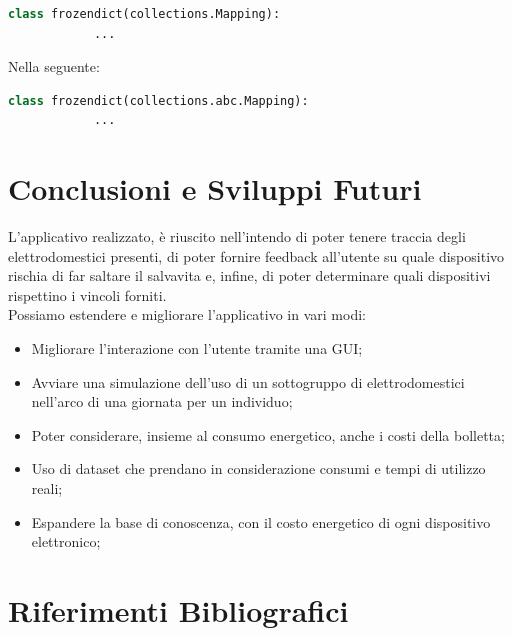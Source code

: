 \documentclass[12pt, letterpaper]{article}
\begin{document}
\begin{lstlisting}[language=Python]
      class frozendict(collections.Mapping):
            ...
\end{lstlisting}

Nella seguente:

\begin{lstlisting}[language=Python]
      class frozendict(collections.abc.Mapping):
            ...
\end{lstlisting}

\section{Conclusioni e Sviluppi Futuri}

L'applicativo realizzato, è riuscito nell'intendo di poter tenere traccia degli elettrodomestici
presenti, di poter fornire feedback all'utente su quale dispositivo rischia di far saltare il salvavita
e, infine, di poter determinare quali dispositivi rispettino i vincoli forniti. \\

\noindent Possiamo estendere e migliorare l'applicativo in vari modi:
\begin{itemize}
      \item Migliorare l'interazione con l'utente tramite una GUI;
      \item Avviare una simulazione dell'uso di un sottogruppo di elettrodomestici
            nell'arco di una giornata per un individuo;
      \item Poter considerare, insieme al consumo energetico, anche i costi della bolletta;
      \item Uso di dataset che prendano in considerazione consumi e tempi di utilizzo reali;
      \item Espandere la base di conoscenza, con il costo energetico di ogni dispositivo elettronico;
\end{itemize}

\section{Riferimenti Bibliografici}
\end{document}
